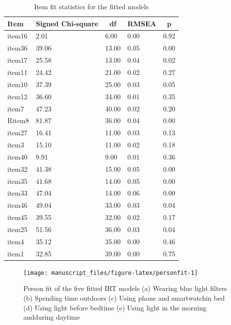 \documentclass[
  english,
  man]{apa6}
\begin{document}
\begin{table}[tbp]

\begin{center}
\begin{threeparttable}

\caption{\label{tab:itemfittab}Item fit statistics for the fitted models}

\begin{tabular}{lllll}
\toprule
Item & \multicolumn{1}{c}{Signed Chi-square} & \multicolumn{1}{c}{df} & \multicolumn{1}{c}{RMSEA} & \multicolumn{1}{c}{p}\\
\midrule
item16 & 2.01 & 6.00 & 0.00 & 0.92\\
item36 & 39.06 & 13.00 & 0.05 & 0.00\\
item17 & 25.58 & 13.00 & 0.04 & 0.02\\
item11 & 24.42 & 21.00 & 0.02 & 0.27\\
item10 & 37.39 & 25.00 & 0.03 & 0.05\\
item12 & 36.60 & 34.00 & 0.01 & 0.35\\
item7 & 47.23 & 40.00 & 0.02 & 0.20\\
Ritem8 & 81.87 & 36.00 & 0.04 & 0.00\\
item27 & 16.41 & 11.00 & 0.03 & 0.13\\
item3 & 15.10 & 11.00 & 0.02 & 0.18\\
item40 & 9.91 & 9.00 & 0.01 & 0.36\\
item32 & 41.38 & 15.00 & 0.05 & 0.00\\
item35 & 41.68 & 14.00 & 0.05 & 0.00\\
item33 & 47.04 & 14.00 & 0.06 & 0.00\\
item46 & 49.04 & 33.00 & 0.03 & 0.04\\
item45 & 39.55 & 32.00 & 0.02 & 0.17\\
item25 & 51.56 & 36.00 & 0.03 & 0.04\\
item4 & 35.12 & 35.00 & 0.00 & 0.46\\
item1 & 32.85 & 39.00 & 0.00 & 0.75\\
\bottomrule
\end{tabular}

\end{threeparttable}
\end{center}

\end{table}

\begin{figure}
\texttt{[image: manuscript\_files/figure-latex/personfit-1]} \caption{Person fit of the five fitted IRT models (a) Wearing blue light filters (b) Spending time outdoors (c) Using phone and smartwatchin bed (d) Using light before bedtime (e) Using light in the morning andduring daytime}\label{fig:personfit}
\end{figure}
\end{document}
